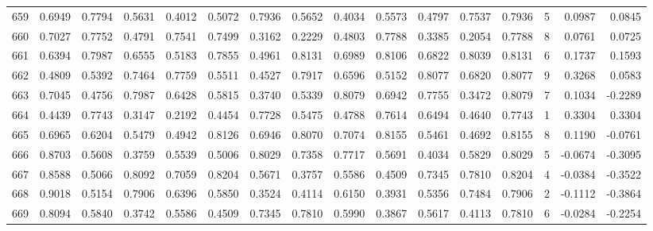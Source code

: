 \begin{tabular}{lrrrrrrrrrrrrrrr}
659 &      0.6949 &  0.7794 &  0.5631 &  0.4012 &  0.5072 &  0.7936 &  0.5652 &  0.4034 &  0.5573 &  0.4797 &   0.7537 &     0.7936 &      5 &                    0.0987 &                     0.0845 \\
660 &      0.7027 &  0.7752 &  0.4791 &  0.7541 &  0.7499 &  0.3162 &  0.2229 &  0.4803 &  0.7788 &  0.3385 &   0.2054 &     0.7788 &      8 &                    0.0761 &                     0.0725 \\
661 &      0.6394 &  0.7987 &  0.6555 &  0.5183 &  0.7855 &  0.4961 &  0.8131 &  0.6989 &  0.8106 &  0.6822 &   0.8039 &     0.8131 &      6 &                    0.1737 &                     0.1593 \\
662 &      0.4809 &  0.5392 &  0.7464 &  0.7759 &  0.5511 &  0.4527 &  0.7917 &  0.6596 &  0.5152 &  0.8077 &   0.6820 &     0.8077 &      9 &                    0.3268 &                     0.0583 \\
663 &      0.7045 &  0.4756 &  0.7987 &  0.6428 &  0.5815 &  0.3740 &  0.5339 &  0.8079 &  0.6942 &  0.7755 &   0.3472 &     0.8079 &      7 &                    0.1034 &                    -0.2289 \\
664 &      0.4439 &  0.7743 &  0.3147 &  0.2192 &  0.4454 &  0.7728 &  0.5475 &  0.4788 &  0.7614 &  0.6494 &   0.4640 &     0.7743 &      1 &                    0.3304 &                     0.3304 \\
665 &      0.6965 &  0.6204 &  0.5479 &  0.4942 &  0.8126 &  0.6946 &  0.8070 &  0.7074 &  0.8155 &  0.5461 &   0.4692 &     0.8155 &      8 &                    0.1190 &                    -0.0761 \\
666 &      0.8703 &  0.5608 &  0.3759 &  0.5539 &  0.5006 &  0.8029 &  0.7358 &  0.7717 &  0.5691 &  0.4034 &   0.5829 &     0.8029 &      5 &                   -0.0674 &                    -0.3095 \\
667 &      0.8588 &  0.5066 &  0.8092 &  0.7059 &  0.8204 &  0.5671 &  0.3757 &  0.5586 &  0.4509 &  0.7345 &   0.7810 &     0.8204 &      4 &                   -0.0384 &                    -0.3522 \\
668 &      0.9018 &  0.5154 &  0.7906 &  0.6396 &  0.5850 &  0.3524 &  0.4114 &  0.6150 &  0.3931 &  0.5356 &   0.7484 &     0.7906 &      2 &                   -0.1112 &                    -0.3864 \\
669 &      0.8094 &  0.5840 &  0.3742 &  0.5586 &  0.4509 &  0.7345 &  0.7810 &  0.5990 &  0.3867 &  0.5617 &   0.4113 &     0.7810 &      6 &                   -0.0284 &                    -0.2254 \\

\end{tabular}
